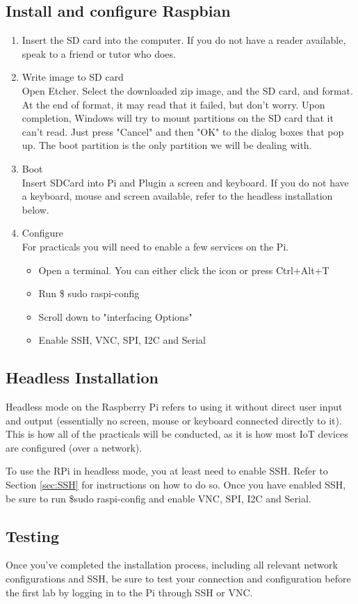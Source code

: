 \subsection{Install and configure Raspbian}
\begin{enumerate}
    \item Insert the SD card into the computer. If you do not have a reader available, speak to a friend or tutor who does.
    \item Write image to SD card\\
        Open Etcher. Select the downloaded zip image, and the SD card, and format. At the end of format, it may read that it failed,  but don't worry. Upon completion, Windows will try to mount partitions on the SD card that it can't read. Just press "Cancel" and then "OK" to the dialog boxes that pop up. The boot partition is the only partition we will be dealing with.
    \item Boot\\
    Insert SDCard into Pi and Plugin a screen and keyboard. If you do not have a keyboard, mouse and screen available, refer to the headless installation below.
    \item Configure\\
    For practicals you will need to enable a few services on the Pi.
    \begin{itemize}
        \item Open a terminal. You can either click the icon or press Ctrl+Alt+T
        \item Run \$ sudo raspi-config
        \item Scroll down to "interfacing Options"
        \item Enable SSH, VNC, SPI, I2C and Serial
    \end{itemize}
\end{enumerate}

\subsection{Headless Installation}
Headless mode on the Raspberry Pi refers to using it without direct user input and output (essentially no screen, mouse or keyboard connected directly to it). This is how all of the practicals will be conducted, as it is how most IoT devices are configured (over a network).

To use the RPi in headless mode, you at least need to enable SSH. Refer to Section \ref{sec:SSH} for instructions on how to do so. Once you have enabled SSH, be sure to run \$sudo raspi-config and enable VNC, SPI, I2C and Serial.

\subsection{Testing}
Once you've completed the installation process, including all relevant network configurations and SSH, be sure to test your connection and configuration before the first lab by logging in to the Pi through SSH or VNC.